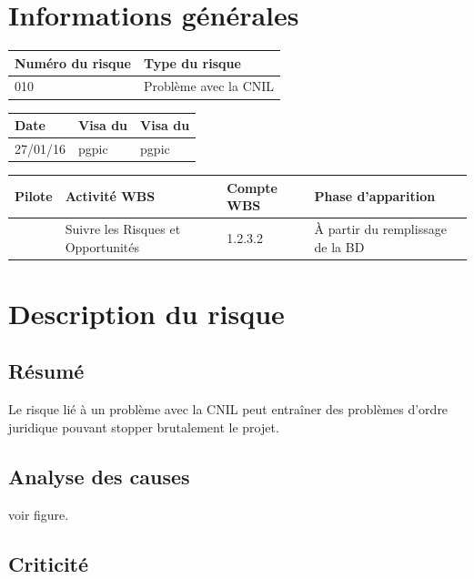 \section*{Informations générales}
 
\begin{table}[h]
\centering
	\begin{tabularx}{16.8cm}{|X|X|}
	\hline
	Numéro du risque & Type du risque \\
	\hline
	010 & Problème avec la CNIL\\
	\hline
	\end{tabularx}
\end{table}

\begin{table}[h]
\centering
	\begin{tabularx}{12.8cm}{|X|X|X|}
	\hline
	Date & Visa du \RQ & Visa du \CP \\
	\hline
	 27/01/16 & pgpic & pgpic \\
	\hline
	\end{tabularx}
\end{table}

\begin{table}[h]
\centering
	\begin{tabularx}{12.8cm}{|X|X|X|X|}
	\hline
	Pilote & Activité WBS & Compte WBS & Phase d'apparition \\
	\hline
	 \Pierre & Suivre les Risques et Opportunités & 1.2.3.2 & À partir du remplissage de la BD \\
	\hline
	\end{tabularx}
\end{table}

\section*{Description du risque}

\subsection*{Résumé}
	Le risque lié à un problème avec la CNIL peut entraîner des problèmes d'ordre juridique pouvant stopper brutalement le projet.
	
\subsection*{Analyse des causes}
	voir figure.

\subsection*{Criticité}

